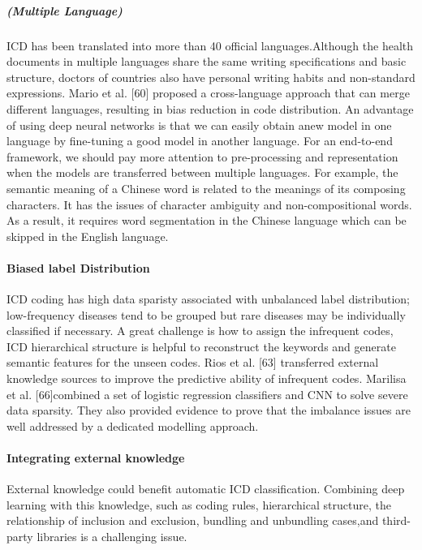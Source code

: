 \subparagraph{(Multiple Language)}
ICD has been translated into more than 40 official languages.Although the health documents in multiple languages share the same writing specifications and basic structure, doctors of  countries  also  have  personal  writing  habits  and  non-standard  expressions.  Mario  et  al.  [60]  proposed  a  cross-language approach that can merge different languages, resulting in bias reduction in code distribution. An advantage of using deep neural networks is that we can easily obtain anew model in one language by fine-tuning a good model in another language.
For  an  end-to-end  framework,  we  should  pay  more attention  to  pre-processing  and  representation  when  the models  are  transferred  between  multiple  languages.  For example,  the  semantic  meaning  of  a  Chinese  word  is  related  to  the  meanings  of  its  composing  characters.  It  has the  issues  of  character  ambiguity  and  non-compositional words.  As  a  result,  it  requires  word  segmentation  in  the Chinese language  which can be skipped in the English language.

\paragraph{Biased label Distribution}
ICD coding has high data sparisty associated with unbalanced label distribution; low-frequency diseases tend to be grouped but rare diseases may be individually classified if necessary. 
A great challenge is how to assign the infrequent codes, ICD  hierarchical  structure  is  helpful  to  reconstruct  the keywords  and  generate  semantic  features  for  the  unseen codes.   Rios   et   al.   [63]   transferred   external   knowledge sources to improve the predictive ability of infrequent codes. Marilisa  et  al.  [66]combined  a  set  of  logistic  regression  classifiers  and  CNN to solve severe data sparsity. They also provided evidence to  prove  that  the  imbalance  issues  are  well  addressed  by a  dedicated  modelling  approach. 

\paragraph{Integrating external knowledge}
External knowledge could benefit automatic ICD classification.  Combining  deep  learning  with  this  knowledge,  such as  coding  rules,  hierarchical  structure,  the  relationship of inclusion  and  exclusion,  bundling  and  unbundling  cases,and third-party libraries is a challenging issue.

